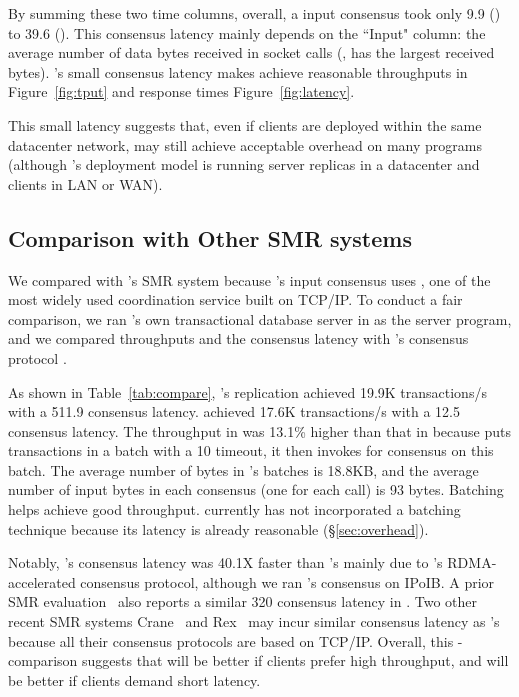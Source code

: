 By summing these two time columns, overall, a \xxx input consensus took only 
9.9 \us (\redis) to 39.6 \us (\mongodb). This consensus latency mainly depends 
on the ``Input" column: the average number of data bytes received in socket 
calls (\eg, \mongodb has the largest received bytes). \xxx's small consensus 
latency makes \xxx achieve reasonable throughputs in Figure~\ref{fig:tput} and 
response times Figure~\ref{fig:latency}.

This small latency suggests that, even if clients are deployed within the same 
datacenter network, \xxx may still achieve acceptable overhead on many programs 
(although \xxx's deployment model is running server replicas in a datacenter and 
clients in LAN 
or WAN).

\subsection{Comparison with Other SMR systems} \label{sec:compare}

We compared \xxx with \calvin's SMR system because \calvin's input consensus 
uses \zookeeper, one of the most widely used coordination service built on 
TCP/IP. To conduct a fair comparison, we ran \calvin's own transactional 
database server in \xxx as the server program, and we compared throughputs and 
the consensus latency with \calvin's consensus protocol \zookeeper.

As shown in Table~\ref{tab:compare}, \calvin's \zookeeper replication achieved 
19.9K transactions/s with a 511.9 \us consensus latency. \xxx achieved 17.6K 
transactions/s with a 12.5 \us consensus latency. The throughput in \calvin 
was 13.1\% higher than that in \xxx because \calvin puts transactions in a 
batch with a 10 \ms timeout, it then invokes \zookeeper for consensus on 
this batch. The average number of bytes in \calvin's batches is 18.8KB, and 
the average number of input bytes in each \xxx consensus (one for each \myread 
call) is 93 bytes. Batching helps \calvin achieve good throughput. \xxx 
currently has not incorporated a batching technique because its latency is 
already reasonable (\S\ref{sec:overhead}).

Notably, \xxx's consensus latency was 40.1X faster than \zookeeper's mainly due 
to \xxx's RDMA-accelerated consensus protocol, although we ran \calvin's 
\zookeeper consensus on IPoIB. A prior SMR evaluation~\cite{dare:hpdc15} also 
reports a similar 320 \us consensus latency in \zookeeper. Two other recent SMR 
systems Crane~\cite{crane:sosp15} and Rex~\cite{rex:eurosys14} may incur similar 
consensus latency as \zookeeper's because all their consensus protocols are 
based on TCP/IP. Overall, this \xxx-\calvin comparison suggests that \calvin 
will be better if clients prefer high throughput, and \xxx will be better if 
clients demand short latency.

